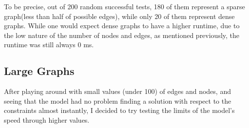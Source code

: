 \documentclass{article}
\begin{document}
To be precise, out of 200 random successful tests, 180 of them represent a sparse graph(less than half of possible edges), while only 20
of them represent dense graphs. While one would expect dense graphs to have a higher runtime, due to the low nature of the number of nodes 
and edges, as mentioned previously, the runtime was still always 0 ms. 
\subsection{Large Graphs} 
After playing around with small values (under 100) of edges and nodes, and seeing that the model had no problem 
finding a solution with respect to the constraints almost instantly, I decided to try testing the limits of the model's speed through higher values.
\end{document}
